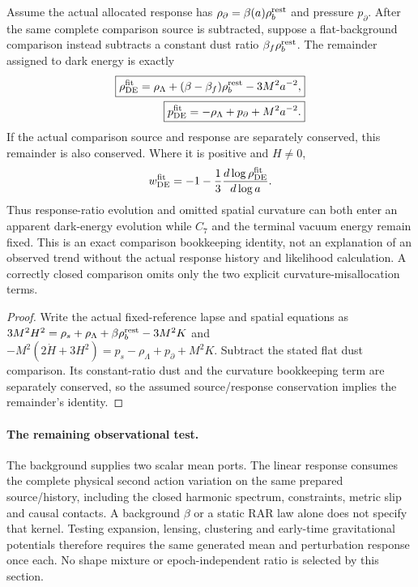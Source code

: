\documentclass[12pt,a4paper]{article}
\begin{document}
\begin{proposition}
\label{p9:prop:v2205-apparent-vacuum-evolution}
Assume the actual allocated response has
$\rho_\partial=\beta(a)\rho_b^{\rm rest}$ and pressure $p_\partial$.
After the same complete comparison source is subtracted, suppose a
flat-background comparison instead subtracts a constant dust ratio
$\beta_f\rho_b^{\rm rest}$. The remainder assigned to dark energy is
exactly
\begin{align}
\label{p9:eq:v2205-apparent-vacuum-evolution}
 \boxed{\rho_{\rm DE}^{\rm fit}
   =\rho_\Lambda+(\beta-\beta_f)\rho_b^{\rm rest}-3M^2a^{-2},}\\
 \boxed{p_{\rm DE}^{\rm fit}
   =-\rho_\Lambda+p_\partial+M^2a^{-2}.}\nonumber
\end{align}
If the actual comparison source and response are separately conserved,
this remainder is also conserved. Where it is positive and $H\ne0$,
\[
 w_{\rm DE}^{\rm fit}=-1-
            \frac13\frac{d\log\rho_{\rm DE}^{\rm fit}}{d\log a}.
\]
Thus response-ratio evolution and omitted spatial curvature can both
enter an apparent dark-energy evolution while $C_7$ and the terminal
vacuum energy remain fixed. This is an exact comparison bookkeeping
identity, not an explanation of an observed trend without the actual
response history and likelihood calculation. A correctly closed
comparison omits only the two explicit curvature-misallocation terms.
\end{proposition}
\begin{proof}
Write the actual fixed-reference lapse and spatial equations as
$3M^2H^2=\rho_s+\rho_\Lambda+\beta\rho_b^{\rm rest}-3M^2K$
and
$-M^2(2\dot H+3H^2)=p_s-\rho_\Lambda+p_\partial+M^2K$.
Subtract the stated flat dust comparison. Its constant-ratio dust and
the curvature bookkeeping term are separately conserved, so the
assumed source/response conservation implies the remainder's identity.
\end{proof}

\paragraph{The remaining observational test.}
The background supplies two scalar mean ports. The linear response
consumes the complete physical second action variation on the same
prepared source/history, including the closed harmonic spectrum,
constraints, metric slip and causal contacts. A background $\beta$ or a
static RAR law alone does not specify that kernel. Testing expansion,
lensing, clustering and early-time gravitational potentials therefore
requires the same generated mean and perturbation response once each.
No shape mixture or epoch-independent ratio is selected by this section.
\end{document}
